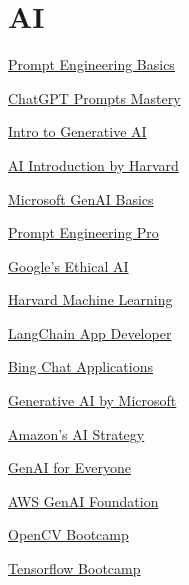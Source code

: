 \chapter{AI}
\label{chap:ai}


\href{https://lnkd.in/e3Ww6pDz}{Prompt Engineering Basics}

\href{https://lnkd.in/eKzysUbR}{ChatGPT Prompts Mastery}

\href{https://lnkd.in/eFP9u3xW}{Intro to Generative AI}

\href{https://lnkd.in/eNJ_4Cnp}{AI Introduction by Harvard}

\href{https://lnkd.in/ecnYgiqb}{Microsoft GenAI Basics}

\href{https://learnprompting.org}{Prompt Engineering Pro}

\href{https://lnkd.in/enpfVNCw}{Google's Ethical AI}

\href{https://lnkd.in/ev_zVCPp}{Harvard Machine Learning}

\href{https://lnkd.in/eJwkGmUt}{LangChain App Developer}

\href{https://lnkd.in/eac_zdyG}{Bing Chat Applications}

\href{https://lnkd.in/eQVesg8u}{Generative AI by Microsoft}

\href{https://lnkd.in/e39JKBk2}{Amazon's AI Strategy}

\href{https://lnkd.in/ehM_B_Wv}{GenAI for Everyone}

\href{https://lnkd.in/e7QpZaJ6}{AWS GenAI Foundation}

\href{https://lnkd.in/ebtRK8jM}{OpenCV Bootcamp}

\href{https://lnkd.in/eKDRhk7Q}{Tensorflow Bootcamp}
